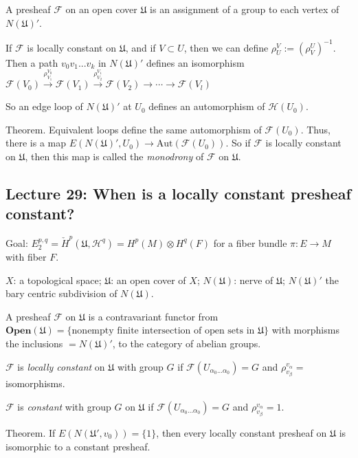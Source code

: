 \documentclass{article}
\theoremstyle{mystyle}
\theoremstyle{remark}
\numberwithin{equation}{section}
\begin{document}
A presheaf $\mathcal{F}$ on an open cover $\mathfrak{U}$ is an assignment of a group to each vertex of $N(\mathfrak{U})'$. 

If $\mathcal{F}$ is locally constant on $\mathfrak{U}$, and if $V\subset U$, then we can define $\rho^V_U:= (\rho^U_V)^{-1}$. Then a path $v_0v_1...v_k$ in $N(\mathfrak{U})'$ defines an isomorphism
$\mathcal{F}(V_0)\xrightarrow{\rho_{V_1}^{V_0}}\mathcal{F}(V_1)\xrightarrow{\rho_{V_2}^{V_1}}\mathcal{F}(V_2)
\rightarrow \cdots \rightarrow \mathcal{F}(V_l)$

So an edge loop of $N(\mathfrak{U})'$ at $U_0$ defines an automorphism of $\mathcal{H}(U_0)$. 

Theorem. Equivalent loops define the same automorphism of $\mathcal{F}(U_0)$. Thus, there is a map $E(N(\mathfrak{U})',U_0)\rightarrow \mathrm{Aut}(\mathcal{F}(U_0))$. So if $\mathcal{F}$ is locally constant on $\mathfrak{U}$, then this map is called the \emph{monodrony} of $\mathcal{F}$ on $\mathfrak{U}$.







\subsection{Lecture 29: When is a locally constant presheaf constant?}

Goal: $E^{p,q}_2 = \check{H}^p(\mathfrak{U},\mathcal{H}^q) = H^p(M)\otimes H^q(F)$ for a fiber bundle $\pi\colon E\rightarrow M$ with fiber $F$.

$X$: a topological space; $\mathfrak{U}$: an open cover of $X$; $N(\mathfrak{U})$: nerve of $\mathfrak{U}$; $N(\mathfrak{U})'$ the bary centric subdivision of $N(\mathfrak{U})$. 

A presheaf $\mathcal{F}$ on $\mathfrak{U}$ is a contravariant functor from $\mathbf{Open}(\mathfrak{U}) = \{\text{nonempty finite intersection of open sets in }\mathfrak{U}\}$ with morphisms the inclusions $=N(\mathfrak{U})'$, to the category of abelian groups.


$\mathcal{F}$ is \emph{locally constant} on $\mathfrak{U}$ with group $G$ if $\mathcal{F}(U_{\alpha_0...\alpha_0}) = G$ and $\rho^{v_\alpha}_{v_\beta}=$ isomorphisms.

$\mathcal{F}$ is \emph{constant} with group $G$ on $\mathfrak{U}$ if $\mathcal{F}(U_{\alpha_0...\alpha_0}) = G$ and $\rho^{v_\alpha}_{v_\beta} = 1$. 

Theorem. If $E(N(\mathfrak{U}',v_0)) = \{1\}$, then every locally constant presheaf on $\mathfrak{U}$ is isomorphic to a constant presheaf. 
\end{document}
